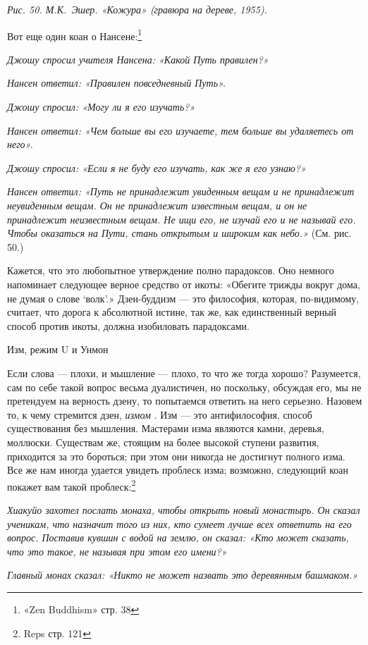 \documentclass[../main.tex]{subfiles}
\begin{document}
\emph{Рис. 50. М.К.~Эшер. «Кожура» (гравюра на дереве, 1955).}

Вот еще один коан о Нансене:\footnote{«Zen Buddhism» стр. 38}

\emph{Джошу спросил учителя Нансена: «Какой Путь правилен?»}

\emph{Нансен ответил: «Правилен повседневный Путь».}

\emph{Джошу спросил: «Могу ли я его изучать?»}

\emph{Нансен ответил: «Чем больше вы его изучаете, тем больше вы удаляетесь от него».}

\emph{Джошу спросил: «Если я не буду его изучать, как же я его узнаю?»}

\emph{Нансен ответил: «Путь не принадлежит увиденным вещам и не принадлежит неувиденным вещам. Он не принадлежит известным вещам, и он не принадлежит неизвестным вещам. Не ищи его, не изучай его и не называй его. Чтобы оказаться на Пути, стань открытым и широким как небо.»} (См. рис. 50.)

Кажется, что это любопытное утверждение полно парадоксов. Оно немного напоминает следующее верное средство от икоты: «Обегите трижды вокруг дома, не думая о слове \enquote*{волк}.» Дзен-буддизм --- это философия, которая, по-видимому, считает, что дорога к абсолютной истине, так же, как единственный верный способ против икоты, должна изобиловать парадоксами.

Изм, режим U и Унмон

Если слова --- плохи, и мышление --- плохо, то что же тогда хорошо? Разумеется, сам по себе такой вопрос весьма дуалистичен, но поскольку, обсуждая его, мы не претендуем на верность дзену, то попытаемся ответить на него серьезно. Назовем то, к чему стремится дзен, \emph{измом} . Изм --- это антифилософия, способ существования без мышления. Мастерами изма являются камни, деревья, моллюски. Существам же, стоящим на более высокой ступени развития, приходится за это бороться; при этом они никогда не достигнут полного изма. Все же нам иногда удается увидеть проблеск изма; возможно, следующий коан покажет вам такой проблеск:\footnote{Reps стр. 121}

\emph{Хиакуйо захотел послать монаха, чтобы открыть новый монастырь. Он сказал ученикам, что назначит того из них, кто сумеет лучше всех ответить на его вопрос. Поставив кувшин с водой на землю, он сказал: «Кто может сказать, что это такое, не называя при этом его имени?»}

\emph{Главный монах сказал: «Никто не может назвать это деревянным башмаком.»}
\end{document}
